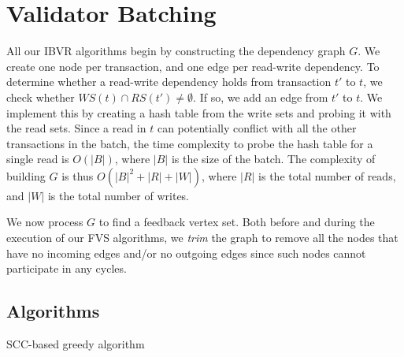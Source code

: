 
\section{Validator Batching}
\label{sec:valbatching}
All our IBVR algorithms begin by constructing the dependency graph $G$. 
We create one node per transaction, and one edge per read-write dependency. 
To determine whether a read-write dependency holds from transaction $t'$ to $t$, we check whether $WS(t) \cap RS(t') \neq \emptyset$. If so, we add an edge from $t'$ to $t$. We implement this by creating a hash table from the write sets and probing it with the read sets. Since a read in $t$ can potentially conflict with all the other transactions in the batch, the time complexity to probe the hash table for a single read is $O(|B|)$, where $|B|$ is the size of the batch. The complexity of building $G$ is thus $O(|B|^2+|R|+|W|)$, where $|R|$ is the total number of reads, and $|W|$ is the total number of writes. 

We now process $G$ to find a feedback vertex set. Both before and during the
execution of our FVS algorithms, we \emph{trim} the graph to remove all the nodes
that have no incoming edges and/or no outgoing edges since such nodes cannot
participate in any cycles.

\subsection{Algorithms}
\label{subsec:validator_reordering:algorithm}

\begin{algorithm}[t]
	\SetAlgoLined\DontPrintSemicolon
	
	
	\caption{SCC-based greedy algorithm}
	\label{alg:scc}
\end{algorithm}


